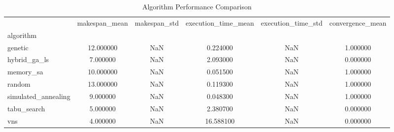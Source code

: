 \begin{table}
\caption{Algorithm Performance Comparison}
\label{tab:algorithm_comparison}
\begin{tabular}{l|cc|cc|c}
\toprule
 & makespan_mean & makespan_std & execution_time_mean & execution_time_std & convergence_mean \\
algorithm &  &  &  &  &  \\
\midrule
genetic & 12.000000 & NaN & 0.224000 & NaN & 1.000000 \\
hybrid_ga_ls & 7.000000 & NaN & 2.093000 & NaN & 0.000000 \\
memory_sa & 10.000000 & NaN & 0.051500 & NaN & 1.000000 \\
random & 13.000000 & NaN & 0.119300 & NaN & 1.000000 \\
simulated_annealing & 9.000000 & NaN & 0.048300 & NaN & 1.000000 \\
tabu_search & 5.000000 & NaN & 2.380700 & NaN & 0.000000 \\
vns & 4.000000 & NaN & 16.588100 & NaN & 0.000000 \\
\bottomrule
\end{tabular}
\end{table}
